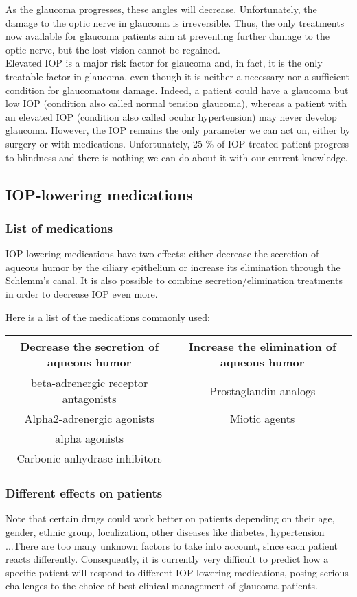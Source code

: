 \documentclass[english,12pt]{article}
\begin{document}
As the glaucoma progresses, these angles will decrease. Unfortunately, the damage to the optic nerve in glaucoma is irreversible. Thus, the only treatments now available for glaucoma patients aim at preventing further damage to the optic nerve, but the lost vision cannot be regained.\\
%
Elevated IOP is a major risk factor for glaucoma and, in fact, it is the only treatable factor in glaucoma, even though it is neither a necessary nor a sufficient condition for glaucomatous damage. Indeed, a patient could have a glaucoma but low IOP (condition also called normal tension glaucoma), whereas a patient with an elevated IOP (condition also called ocular hypertension) may never develop glaucoma. However, the IOP remains the only parameter we can act on, either by surgery or with medications. 
Unfortunately, 25 \% of IOP-treated patient progress to blindness and there is nothing we can do about it with our current knowledge.
\subsection{IOP-lowering medications}
\subsubsection{List of medications}
IOP-lowering medications have two effects: either decrease the secretion of aqueous humor by the ciliary epithelium or increase its elimination through the Schlemm's canal. It is also possible to combine secretion/elimination treatments in order to decrease IOP even more.

Here is a list of the medications commonly used:\\
\begin{tabular}{|c|c|}
\hline
Decrease the secretion of aqueous humor & Increase the elimination of aqueous humor\\
\hline
beta-adrenergic receptor antagonists & Prostaglandin analogs \\
Alpha2-adrenergic agonists & Miotic agents \\
alpha agonists &  \\
Carbonic anhydrase inhibitors &  \\
\hline
\end{tabular}
\subsubsection{Different effects on patients}
Note that certain drugs could work better on patients depending on their age, gender, ethnic group, localization, other diseases like diabetes, hypertension ...There are too many unknown factors to take into account, since each patient reacts differently. 
Consequently, it is currently very difficult to predict how a specific patient will respond to different IOP-lowering medications, posing serious challenges to the choice of best clinical management of glaucoma patients.\\
\end{document}
